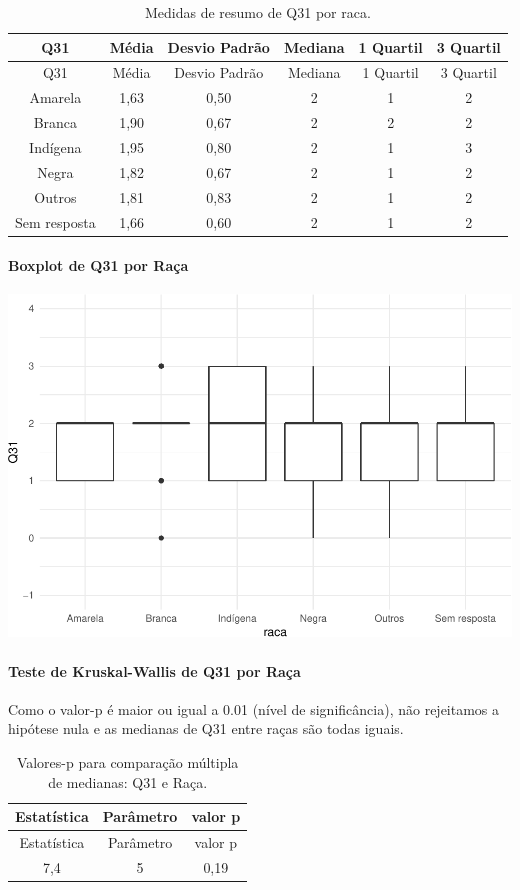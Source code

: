 \documentclass[]{article}
\let\oldparagraph\paragraph
\renewcommand{\paragraph}[1]{\oldparagraph{#1}\mbox{}}
\begin{document}
\begin{longtable}[]{@{}cccccc@{}}
\caption{\label{tab:unnamed-chunk-1049}Medidas de resumo de Q31 por raca.}\tabularnewline
\toprule
Q31 & Média & Desvio Padrão & Mediana & 1 Quartil & 3 Quartil\tabularnewline
\midrule
\endfirsthead
\toprule
Q31 & Média & Desvio Padrão & Mediana & 1 Quartil & 3 Quartil\tabularnewline
\midrule
\endhead
Amarela & 1,63 & 0,50 & 2 & 1 & 2\tabularnewline
Branca & 1,90 & 0,67 & 2 & 2 & 2\tabularnewline
Indígena & 1,95 & 0,80 & 2 & 1 & 3\tabularnewline
Negra & 1,82 & 0,67 & 2 & 1 & 2\tabularnewline
Outros & 1,81 & 0,83 & 2 & 1 & 2\tabularnewline
Sem resposta & 1,66 & 0,60 & 2 & 1 & 2\tabularnewline
\bottomrule
\end{longtable}

\hypertarget{boxplot-de-q31-por-rauxe7a}{%
\paragraph{Boxplot de Q31 por Raça}\label{boxplot-de-q31-por-rauxe7a}}

\begin{center}\includegraphics[width=0.75\linewidth]{relatorio_covid19_files/figure-latex/unnamed-chunk-1050-1} \end{center}

\hypertarget{teste-de-kruskal-wallis-de-q31-por-rauxe7a}{%
\paragraph{Teste de Kruskal-Wallis de Q31 por Raça}\label{teste-de-kruskal-wallis-de-q31-por-rauxe7a}}

Como o valor-p é maior ou igual a 0.01 (nível de significância), não rejeitamos a hipótese nula e as medianas de Q31 entre raças são todas iguais.

\begin{longtable}[]{@{}ccc@{}}
\caption{\label{tab:unnamed-chunk-1052}Valores-p para comparação múltipla de medianas: Q31 e Raça.}\tabularnewline
\toprule
Estatística & Parâmetro & valor p\tabularnewline
\midrule
\endfirsthead
\toprule
Estatística & Parâmetro & valor p\tabularnewline
\midrule
\endhead
7,4 & 5 & 0,19\tabularnewline
\bottomrule
\end{longtable}
\end{document}
